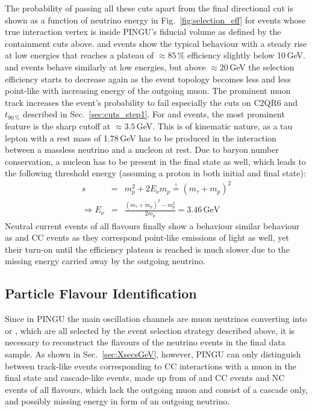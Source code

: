The probability of passing all these cuts apart from the final directional cut
is shown as a function of neutrino energy in Fig.~\ref{fig:selection_eff} for
events whose true interaction vertex is inside PINGU's fiducial volume as
defined by the containment cuts above. \nue and \nuebar events show the typical
behaviour with a steady rise at low energies that reaches a plateau of $\approx
85\,\%$ efficiency slightly below 10\,GeV. \numu and \numubar events behave
similarly at low energies, but above $\approx 20$\,GeV the selection efficiency
starts to decrease again as the event topology becomes less and less point-like
with increasing energy of the outgoing muon. The prominent muon track increases
the event's probability to fail especially the cuts on C2QR6 and $t_{90\,\%}$
described in Sec.~\ref{sec:cuts_step1}. For \nutau and \nutaubar events, the
most prominent feature is the sharp cutoff at $\approx 3.5$\,GeV. This is of
kinematic nature, as a tau lepton with a rest mass of 1.78\,GeV \cite{PDG} has
to be produced in the interaction between a massless neutrino and a nucleon at
rest. Due to baryon number conservation, a nucleon has to be present in the
final state as well, which leads to the following threshold energy (assuming a
proton in both initial and final state):
\begin{eqnarray}
 s &=& m_p^2 + 2 E_\nu m_p \overset{!}{=} (m_\tau + m_p)^2 \\
 \Rightarrow E_\nu &=& \frac{(m_\tau + m_p)^2 - m_p^2}{2 m_p} =
  3.46\,\mathrm{GeV}
\end{eqnarray}
Neutral current events of all flavours finally show a behaviour similar
behaviour as \nue and \nuebar CC events as they correspond point-like emissions
of light as well, yet their turn-on until the efficiency plateau is reached is
much slower due to the missing energy carried away by the outgoing neutrino.

\subsection{Particle Flavour Identification}
\label{sec:cuts_PID}

Since in PINGU the main oscillation channels are muon neutrinos converting into
\nue or \nutau, which are all selected by the event selection strategy
described above, it is necessary to reconstruct the flavours of the neutrino
events in the final data sample. As shown in Sec.~\ref{sec:XsecsGeV},
however, PINGU can only distinguish between track-like events corresponding to
\numu CC interactions with a muon in the final state and cascade-like events,
made up from of \nue and \nutau CC events and NC events of all flavours,
which lack the outgoing muon and consist of a cascade only, and possibly
missing energy in form of an outgoing neutrino.

